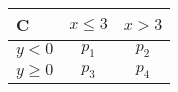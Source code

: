 \documentclass{standalone}
\begin{document}
\begin{NiceTabular}{l|cc}
\toprule
\textsf{C} & $x\leq 3$ & $x>3$\\
\midrule
$y<0$ & $p_1$ & $p_2$\\
$y\geq 0$ & $p_3$ & $p_4$\\
\bottomrule
\end{NiceTabular}
\end{document}
